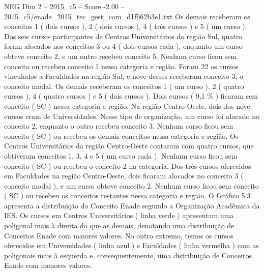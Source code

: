 \begin{textsample}{NEG Dim 2 – 2015\_c5 – Score -2.00 – 2015\_c5/enade\_2015\_tec\_gest\_com\_d1f662b3e1.txt}
Os demais receberam os conceitos 1 ( dois cursos ), 2 ( dois cursos ), 4 ( três cursos ) e 5 ( um curso ).
Dos seis cursos participantes de Centros Universitários da região Sul, quatro foram alocados nos conceitos 3 ou 4 ( dois cursos cada ), enquanto um curso obteve conceito 2, e um outro recebeu conceito 5.
Nenhum curso ficou sem conceito ou recebeu conceito 1 nessa categoria e região.
Foram 22 os cursos vinculados a Faculdades na região Sul, e nove desses receberam conceito 3, o conceito modal.
Os demais receberam os conceitos 1 ( um curso ), 2 ( quatro cursos ), 4 ( quatro cursos ) e 5 ( dois cursos ).
Dois cursos ( 9,1 \% ) ficaram sem conceito ( SC ) nessa categoria e região.
Na região Centro-Oeste, dois dos nove cursos eram de Universidades.
Nesse tipo de organização, um curso foi alocado no conceito 2, enquanto o outro recebeu conceito 3.
Nenhum curso ficou sem conceito ( SC ) ou recebeu os demais conceitos nessa categoria e região.
Os Centros Universitários da região Centro-Oeste contaram com quatro cursos, que obtiveram conceitos 1, 3, 4 e 5 ( um curso cada ).
Nenhum curso ficou sem conceito ( SC ) ou recebeu o conceito 2 na categoria.
Dos três cursos oferecidos em Faculdades na região Centro-Oeste, dois ficaram alocados no conceito 3 ( conceito modal ), e um curso obteve conceito 2.
Nenhum curso ficou sem conceito ( SC ) ou recebeu os conceitos restantes nessa categoria e região.
O Gráfico 5.3 apresenta a distribuição do Conceito Enade segundo a Organização Acadêmica da IES.
Os cursos em Centros Universitários ( linha verde ) apresentam uma poligonal mais à direita do que as demais, denotando uma distribuição de Conceitos Enade com maiores valores.
No outro extremo, temos os cursos oferecidos em Universidades ( linha azul ) e Faculdades ( linha vermelha ) com as poligonais mais à esquerda e, consequentemente, uma distribuição de Conceitos Enade com menores valores.

\end{textsample}
